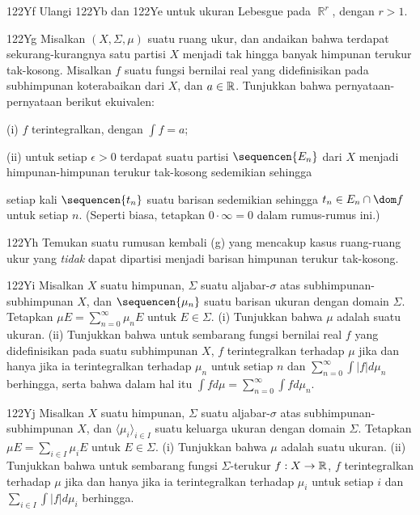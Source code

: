 {\spheader 122Yf Ulangi 122Yb dan 122Ye untuk ukuran Lebesgue pada
$\BbbR^r$, dengan $r>1$.

\spheader 122Yg Misalkan $(X,\Sigma,\mu)$ suatu ruang ukur, dan andaikan
bahwa terdapat sekurang-kurangnya satu partisi $X$ menjadi tak hingga
banyak himpunan terukur tak-kosong. Misalkan $f$ suatu fungsi bernilai
real yang didefinisikan pada subhimpunan koterabaikan dari $X$, dan
$a\in\Bbb R$. Tunjukkan bahwa pernyataan-pernyataan berikut ekuivalen:

\quad (i) $f$ terintegralkan, dengan $\int f=a$;

\quad (ii) untuk setiap $\epsilon>0$ terdapat suatu partisi
$\sequencen{E_n}$ dari $X$ menjadi himpunan-himpunan terukur tak-kosong
sedemikian sehingga


\noindent setiap kali $\sequencen{t_n}$ suatu barisan sedemikian sehingga
$t_n\in E_n\cap\dom f$ untuk setiap $n$. (Seperti biasa, tetapkan
$0\cdot\infty=0$ dalam rumus-rumus ini.) 

\spheader 122Yh Temukan suatu rumusan kembali (g) yang mencakup
kasus ruang-ruang ukur yang {\it tidak} dapat dipartisi menjadi barisan
himpunan terukur tak-kosong.

\spheader 122Yi Misalkan $X$ suatu himpunan, $\Sigma$ suatu
aljabar-$\sigma$ atas subhimpunan-subhimpunan $X$, dan
$\sequencen{\mu_n}$ suatu barisan ukuran dengan domain $\Sigma$.
Tetapkan $\mu E=\sum_{n=0}^{\infty}\mu_nE$ untuk $E\in\Sigma$.
(i) Tunjukkan bahwa $\mu$ adalah suatu ukuran. (ii) Tunjukkan bahwa
untuk sembarang fungsi bernilai real $f$ yang didefinisikan pada suatu
subhimpunan $X$, $f$ terintegralkan terhadap $\mu$ jika dan hanya jika
ia terintegralkan terhadap $\mu_n$ untuk setiap $n$ dan
$\sum_{n=0}^{\infty}\int|f|d\mu_n$ berhingga, serta bahwa dalam hal itu
$\int fd\mu=\sum_{n=0}^{\infty}\int fd\mu_n$.

\spheader 122Yj Misalkan $X$ suatu himpunan, $\Sigma$ suatu
aljabar-$\sigma$ atas subhimpunan-subhimpunan $X$, dan
$\langle\mu_i\rangle_{i\in I}$ suatu keluarga ukuran dengan domain
$\Sigma$. Tetapkan $\mu E=\sum_{i\in I}\mu_iE$ untuk $E\in\Sigma$.
(i) Tunjukkan bahwa $\mu$ adalah suatu ukuran. (ii) Tunjukkan bahwa
untuk sembarang fungsi $\Sigma$-terukur $f:X\to\Bbb R$, $f$
terintegralkan terhadap $\mu$ jika dan hanya jika ia terintegralkan
terhadap $\mu_i$ untuk setiap $i$ dan
$\sum_{i\in I}\int|f|d\mu_i$ berhingga.
}%

